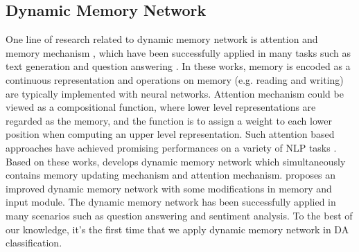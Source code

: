 \documentclass[conference]{IEEEtran}
\begin{document}
	\subsection{Dynamic Memory Network} %
	One line of research related to dynamic memory network is attention and memory mechanism \cite{graves2014neural,bahdanau2014neural}, which have been successfully applied in many tasks such as text generation \cite{you2016image, wan2018improving} and question answering \cite{zhao2017video,pan2017memen}. In these works,  memory is encoded as a continuous representation and operations on memory (e.g. reading and writing) are typically implemented with neural networks. Attention mechanism could be viewed as a compositional function, where lower level representations are regarded as the memory, and the function is to assign a weight to each lower position when computing an upper level representation. Such attention based approaches have achieved promising performances on a variety of NLP tasks \cite{luong2015effective}. Based on these works, \cite{kumar2016ask} develops dynamic memory network which simultaneously contains memory updating mechanism and attention mechanism. \cite{xiong2016dynamic} proposes an improved dynamic memory network with some modifications in memory and input module. The dynamic memory network has been successfully applied in many scenarios such as question answering and sentiment analysis. To the best of our knowledge, it's the first time that we apply dynamic memory network in DA classification.  %
	
\end{document}
